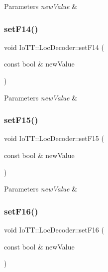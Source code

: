 \begin{DoxyParams}{Parameters}
{\em new\+Value} & \\
\hline
\end{DoxyParams}
\mbox{\label{classIoTT_1_1LocDecoder_a914e4e860e6440b3fcff32c6de2a0e28}} 
\subsubsection{\texorpdfstring{set\+F14()}{setF14()}}
{\footnotesize\ttfamily void Io\+T\+T\+::\+Loc\+Decoder\+::set\+F14 (\begin{DoxyParamCaption}\item[{const bool \&}]{new\+Value }\end{DoxyParamCaption})}


\begin{DoxyParams}{Parameters}
{\em new\+Value} & \\
\hline
\end{DoxyParams}
\mbox{\label{classIoTT_1_1LocDecoder_ae0c9aeac7d21161d898f515ddaffa851}} 
\subsubsection{\texorpdfstring{set\+F15()}{setF15()}}
{\footnotesize\ttfamily void Io\+T\+T\+::\+Loc\+Decoder\+::set\+F15 (\begin{DoxyParamCaption}\item[{const bool \&}]{new\+Value }\end{DoxyParamCaption})}


\begin{DoxyParams}{Parameters}
{\em new\+Value} & \\
\hline
\end{DoxyParams}
\mbox{\label{classIoTT_1_1LocDecoder_a3a38b63ec4f7f9f5f6731e8d328b053c}} 
\subsubsection{\texorpdfstring{set\+F16()}{setF16()}}
{\footnotesize\ttfamily void Io\+T\+T\+::\+Loc\+Decoder\+::set\+F16 (\begin{DoxyParamCaption}\item[{const bool \&}]{new\+Value }\end{DoxyParamCaption})}


